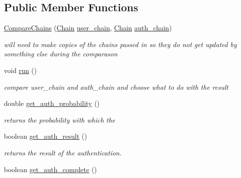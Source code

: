 \subsection*{Public Member Functions}
\begin{DoxyCompactItemize}
\item 
\hyperlink{classruntime_1_1_compare_chains_ae471eeb5d3db8b8e48784d86d5a14a44}{Compare\+Chains} (\hyperlink{classcomponents_1_1_chain}{Chain} \hyperlink{classruntime_1_1_compare_chains_ab222c09ed48638554987292979ede005}{user\+\_\+chain}, \hyperlink{classcomponents_1_1_chain}{Chain} \hyperlink{classruntime_1_1_compare_chains_ac78b36bc65a64fd14906685e6d9410a9}{auth\+\_\+chain})
\begin{DoxyCompactList}\small\item\em will need to make copies of the chains passed in so they do not get updated by something else during the comparason \end{DoxyCompactList}\item 
void \hyperlink{classruntime_1_1_compare_chains_aafa4a766a30bbbb6e205114a699d8158}{run} ()
\begin{DoxyCompactList}\small\item\em compare user\+\_\+chain and auth\+\_\+chain and choose what to do with the result \end{DoxyCompactList}\item 
double \hyperlink{classruntime_1_1_compare_chains_a684e7b6b0ea4f599a190866647acd144}{get\+\_\+auth\+\_\+probability} ()
\begin{DoxyCompactList}\small\item\em returns the probability with which the \end{DoxyCompactList}\item 
boolean \hyperlink{classruntime_1_1_compare_chains_af5dd0a0034121d92bbfac68adecec1c7}{get\+\_\+auth\+\_\+result} ()
\begin{DoxyCompactList}\small\item\em returns the result of the authentication. \end{DoxyCompactList}\item 
boolean \hyperlink{classruntime_1_1_compare_chains_a3e4a09371bcb8d006d646f9c58b5596c}{get\+\_\+auth\+\_\+complete} ()
\end{DoxyCompactItemize}
